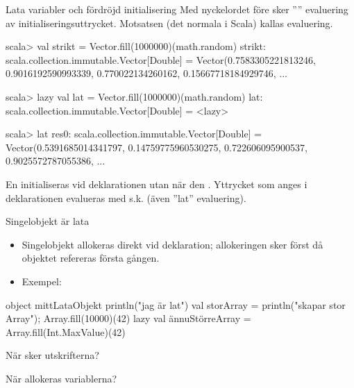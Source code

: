 
\begin{Slide}{Lata variabler och fördröjd initialisering}
Med nyckelordet  före  sker '''' evaluering av initialiseringsuttrycket. Motsatsen (det normala i Scala) kallas  evaluering.
\begin{REPL}
scala> val strikt = Vector.fill(1000000)(math.random)
strikt: scala.collection.immutable.Vector[Double] =
 Vector(0.7583305221813246, 0.9016192590993339, 0.770022134260162, 0.15667718184929746, ...

scala> lazy val lat = Vector.fill(1000000)(math.random)
lat: scala.collection.immutable.Vector[Double] = <lazy>

scala> lat
res0: scala.collection.immutable.Vector[Double] =
  Vector(0.5391685014341797, 0.14759775960530275, 0.722606095900537, 0.9025572787055386, ...
\end{REPL}

En  initialiseras  vid deklarationen utan när den . Yttrycket som anges i deklarationen evalueras med s.k.  (även ''lat'' evaluering).
\end{Slide}




\begin{Slide}{Singelobjekt är lata}

\begin{itemize}
  \item Singelobjekt allokeras  direkt vid deklaration; allokeringen sker först då objektet refereras första gången.

\pause

  \item Exempel:

\end{itemize}

\begin{Code}
object mittLataObjekt {
  println("jag är lat")
  val storArray = { println("skapar stor Array"); Array.fill(10000)(42) }
  lazy val ännuStörreArray = Array.fill(Int.MaxValue)(42)
}
\end{Code}

När sker utskrifterna?

När allokeras variablerna?

\end{Slide}





